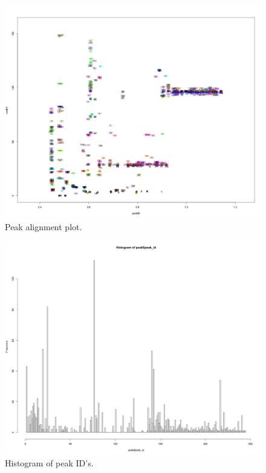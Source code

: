 \begin{figure}[h]
\centering
\includegraphics[width=1.00\textwidth]{../../plots/peak/peakoutput.png}
\caption{Peak alignment plot.}
\label{fig:peak_align}
\end{figure}

\begin{figure}[h]
\centering
\includegraphics[width=1.00\textwidth]{../../plots/peak/peakoutput_histogram.png}
\caption{Histogram of peak ID's.}
\label{fig:peak_hist}
\end{figure}